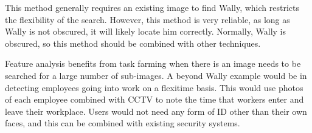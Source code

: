 \documentclass[../main.tex]{subfiles}
\begin{document}
    This method generally requires an existing image to find Wally, which restricts the flexibility of the search.
    However, this method is very reliable, as long as Wally is not obscured, it will likely locate him correctly.
    Normally, Wally is obscured, so this method should be combined with other techniques.

    Feature analysis benefits from task farming when there is an image needs to be searched for a large number of sub-images.
    A beyond Wally example would be in detecting employees going into work on a flexitime basis.
    This would use photos of each employee combined with CCTV to note the time that workers enter and leave their workplace.
    Users would not need any form of ID other than their own faces, and this can be combined with existing security systems.    
\end{document}
